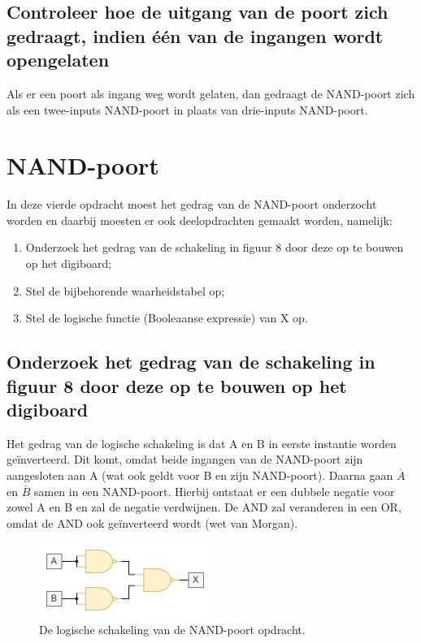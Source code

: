 \documentclass[12pt]{article}
\begin{document}
\subsection{Controleer hoe de uitgang van de poort zich gedraagt, indien één van de ingangen wordt opengelaten}
Als er een poort als ingang weg wordt gelaten, dan gedraagt de NAND-poort zich als een twee-inputs NAND-poort in plaats van drie-inputs NAND-poort.
\pagebreak

\section{NAND-poort}
In deze vierde opdracht moest het gedrag van de NAND-poort onderzocht worden en daarbij moesten er ook deelopdrachten gemaakt worden, namelijk:
\begin{enumerate}
    \item Onderzoek het gedrag van de schakeling in figuur 8 door deze op te bouwen op het digiboard;
    \item Stel de bijbehorende waarheidstabel op;
    \item Stel de logische functie (Booleaanse expressie) van X op.
\end{enumerate}

\subsection{Onderzoek het gedrag van de schakeling in figuur 8 door deze op te bouwen op het digiboard}
Het gedrag van de logische schakeling is dat A en B in eerste instantie worden geïnverteerd. Dit komt, omdat beide ingangen van de NAND-poort zijn aangesloten aan A (wat ook geldt voor B en zijn NAND-poort). 
Daarna gaan $\overline{A}$ en $\overline{B}$ samen in een NAND-poort. Hierbij ontstaat er een dubbele negatie voor zowel A en B en zal de negatie verdwijnen. De AND zal veranderen in een OR, omdat de AND ook geïnverteerd wordt (wet van Morgan).
\begin{figure}[h]
    \centering
    \includegraphics[width=0.5\textwidth]{figuur11.png}
    \caption{De logische schakeling van de NAND-poort opdracht.}
    \label{fig:11}
\end{figure}
\end{document}
